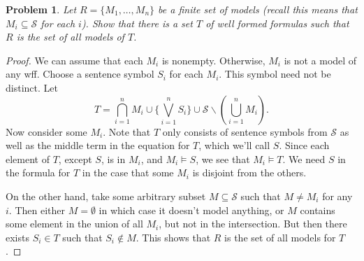 \documentclass{article}
\newtheorem{problem}{Problem}
\begin{document}
\begin{problem}
Let $R = \{M_1, \dots, M_n\}$ be a finite set of models (recall this means that $M_i \subseteq \mathcal{S}$ for each $i$). Show that there is a set $T$ of well formed formulas such that $R$ is the set of all models of $T$.
\end{problem}
\begin{proof}
We can assume that each $M_i$ is nonempty. Otherwise, $M_i$ is not a model of any wff. Choose a sentence symbol $S_i$ for each $M_i$. This symbol need not be distinct. Let
\[
T = \bigcap_{i=1}^{n} M_i \cup \{\bigvee_{i=1}^{n} S_i \} \cup \mathcal{S} \backslash \left ( \bigcup_{i=1}^{n} M_i \right ).
\]
Now consider some $M_i$. Note that $T$ only consists of sentence symbols from $\mathcal{S}$ as well as the middle term in the equation for $T$, which we'll call $S$. Since each element of $T$, except $S$, is in $M_i$, and $M_i \models S$, we see that $M_i \models T$. We need $S$ in the formula for $T$ in the case that some $M_i$ is disjoint from the others.

On the other hand, take some arbitrary subset $M \subseteq \mathcal{S}$ such that $M \neq M_i$ for any $i$. Then either $M = \emptyset$ in which case it doesn't model anything, or $M$ contains some element in the union of all $M_i$, but not in the intersection. But then there exists $S_i \in T$ such that $S_i \notin M$. This shows that $R$ is the set of all models for $T$.
\end{proof}
\end{document}
